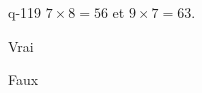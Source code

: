 \begin{truefalse}{q-119}
$7\times 8 = 56$ et $9\times 7 = 63$.
\item* Vrai
\item Faux
\end{truefalse}

